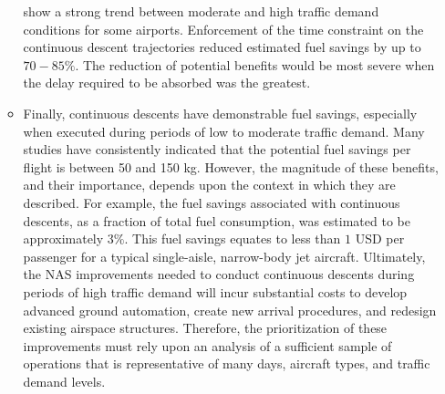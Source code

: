 \documentclass{aer1315-pretty}
\begin{document}
\begin{itemize}
\begin{itemize}
show a strong trend between moderate and high traffic demand conditions for some airports. Enforcement of the time constraint on the continuous descent trajectories reduced estimated fuel savings by up to $70-85\%$. The reduction of potential benefits would be most severe when the delay required to be absorbed was the greatest.
\item Finally, continuous descents have demonstrable fuel savings, especially when executed during periods of low to moderate traffic demand. Many studies have consistently indicated that the potential fuel savings per flight is between 50 and 150 kg. However, the magnitude of these benefits, and their importance, depends upon the context
in which they are described. For example, the fuel savings associated with continuous descents, as a fraction of total fuel consumption, was estimated to be approximately $3\%$. This fuel savings equates to less than $1$ USD per passenger for a typical single-aisle, narrow-body jet aircraft. Ultimately, the NAS improvements needed to conduct
continuous descents during periods of high traffic demand will incur substantial costs to develop advanced ground automation, create new arrival procedures, and redesign existing airspace structures. Therefore, the prioritization of these improvements must rely upon an analysis of a sufficient sample of operations that is representative of many days, aircraft types, and traffic demand levels. 
\end{itemize}



\end{itemize}
\end{document}
